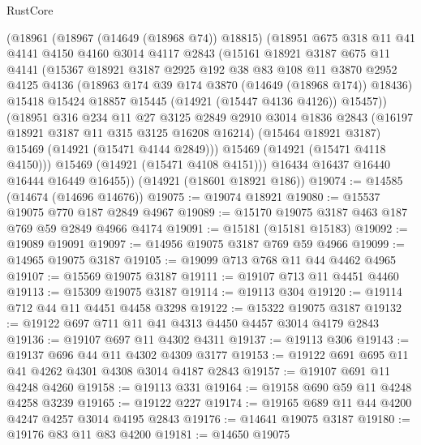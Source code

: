 \begin{lexlean}{RustCore}
\begin{coremodule}
        (@18961
          (@18967 (@14649 (@18968 @74)) @18815)
          (@18951
            @675
            @318
            @11
            @41
            @4141
            @4150
            @4160
            @3014
            @4117
            @2843
            (@15161
              @18921
              @3187
              @675
              @11
              @4141
              (@15367
                @18921
                @3187
                @2925
                @192
                @38
                @83
                @108
                @11
                @3870
                @2952
                @4125
                @4136
                (@18963 @174 @39 @174 @3870 (@14649 (@18968 @174)) @18436)
                @15418
                @15424
                @18857
                @15445
                (@14921 (@15447 @4136 @4126))
                @15457))
            (@18951
              @316
              @234
              @11
              @27
              @3125
              @2849
              @2910
              @3014
              @1836
              @2843
              (@16197 @18921 @3187 @11 @315 @3125 @16208 @16214)
              (@15464 @18921 @3187)
              @15469
              (@14921 (@15471 @4144 @2849)))
            @15469
            (@14921 (@15471 @4118 @4150)))
          @15469
          (@14921 (@15471 @4108 @4151)))
        @16434
        @16437
        @16440
        @16444
        @16449
        @16455))
    (@14921 (@18601 @18921 @186))
@19074 := @14585 (@14674 (@14696 @14676))
@19075 := @19074 @18921
@19080 := @15537 @19075 @770 @187 @2849 @4967
@19089 := @15170 @19075 @3187 @463 @187 @769 @59 @2849 @4966 @4174
@19091 := @15181 (@15181 @15183)
@19092 := @19089 @19091
@19097 := @14956 @19075 @3187 @769 @59 @4966
@19099 := @14965 @19075 @3187
@19105 := @19099 @713 @768 @11 @44 @4462 @4965
@19107 := @15569 @19075 @3187
@19111 := @19107 @713 @11 @4451 @4460
@19113 := @15309 @19075 @3187
@19114 := @19113 @304
@19120 := @19114 @712 @44 @11 @4451 @4458 @3298
@19122 := @15322 @19075 @3187
@19132 := @19122 @697 @711 @11 @41 @4313 @4450 @4457 @3014 @4179 @2843
@19136 := @19107 @697 @11 @4302 @4311
@19137 := @19113 @306
@19143 := @19137 @696 @44 @11 @4302 @4309 @3177
@19153 := @19122 @691 @695 @11 @41 @4262 @4301 @4308 @3014 @4187 @2843
@19157 := @19107 @691 @11 @4248 @4260
@19158 := @19113 @331
@19164 := @19158 @690 @59 @11 @4248 @4258 @3239
@19165 := @19122 @227
@19174 := @19165 @689 @11 @44 @4200 @4247 @4257 @3014 @4195 @2843
@19176 := @14641 @19075 @3187
@19180 := @19176 @83 @11 @83 @4200
@19181 := @14650 @19075

\end{coremodule}
\end{lexlean}
